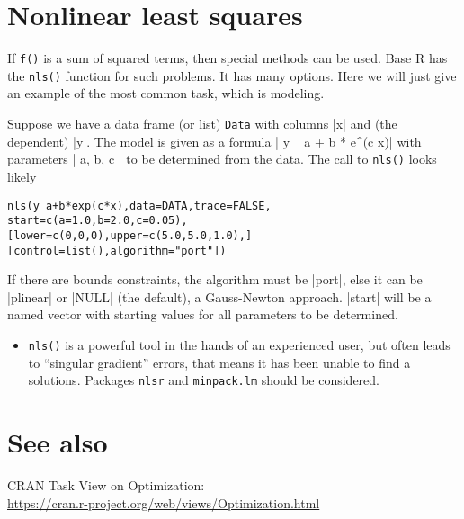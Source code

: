 \documentclass[11pt,a4paper,onecolumn,oneside]{extarticle}
\begin{document}
\begin{landscape}
\begin{multicols}{2}
\section*{\color{darkred} Nonlinear least squares}

If \texttt{f()} is a sum of squared terms, then special methods can be
used. Base R has the \texttt{nls()} function for such problems. It has
many options. Here we will just give an example of the most common task,
which is modeling.


Suppose we have a data frame (or list) \texttt{Data} with columns |x| and
(the dependent) |y|. The model is given as a formula | y ~ a + b * e^(c x)|
with parameters | a, b, c | to be determined from the data. The call to 
\texttt{nls()} looks likely

\begin{alltt}
  nls(y ~ a + b*exp(c*x), data = DATA, trace = FALSE,
      start = c(a = 1.0, b = 2.0, c = 0.05),
      [lower = c(0, 0, 0), upper = c(5.0, 5.0, 1.0),]
      [control = list(), algorithm = "port"])
\end{alltt}

If there are bounds constraints, the algorithm must be |port|, else it 
can be |plinear| or |NULL| (the default), a Gauss-Newton approach.
|start| will be a named vector with starting values for all parameters to be determined.

\begin{itemize}
\setlength\itemsep{0.1em}
\item
  \texttt{nls()} is a powerful tool in the hands of an experienced user,
  but often leads to ``singular gradient'' errors, that means it has been 
  unable to find a solutions. Packages \texttt{nlsr} and \texttt{minpack.lm} 
  should be considered.
\end{itemize}


\section*{\color{darkred} See also}\label{See also}

CRAN Task View on Optimization: \\
\hspace*{6mm}\url{https://cran.r-project.org/web/views/Optimization.html} 


\end{multicols}

\end{landscape}
\end{document}
